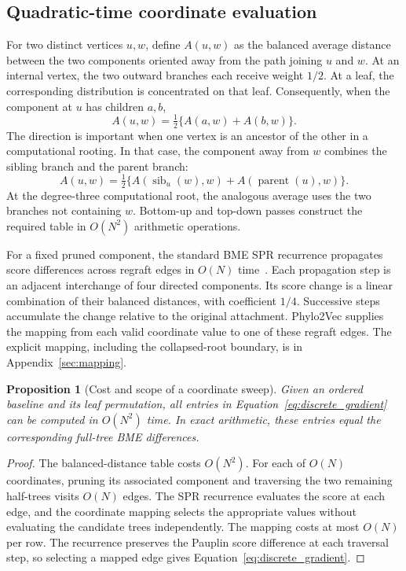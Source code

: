 \documentclass[11pt,a4paper]{article}
\makeatletter
\DeclareRobustCommand{\_}{\ifmmode\nfss@text{\textunderscore}\else\textunderscore\allowbreak\fi}
\newtheorem{proposition}[theorem]{Proposition}
\theoremstyle{definition}
\makeatother
\begin{document}
\subsection{Quadratic-time coordinate evaluation}

For two distinct vertices $u,w$, define $A(u,w)$ as the balanced average distance between the two components oriented away from the path joining $u$ and $w$.
At an internal vertex, the two outward branches each receive weight $1/2$.
At a leaf, the corresponding distribution is concentrated on that leaf.
Consequently, when the component at $u$ has children $a,b$,
\begin{equation}
 A(u,w)=\tfrac12\{A(a,w)+A(b,w)\}.
 \label{eq:bottom_up}
\end{equation}
The direction is important when one vertex is an ancestor of the other in a computational rooting.
In that case, the component away from $w$ combines the sibling branch and the parent branch:
\begin{equation}
 A(u,w)=\tfrac12\{A(\operatorname{sib}_u(w),w)
                         +A(\operatorname{parent}(u),w)\}.
 \label{eq:top_down}
\end{equation}
At the degree-three computational root, the analogous average uses the two branches not containing $w$.
Bottom-up and top-down passes construct the required table in $O(N^2)$ arithmetic operations.

For a fixed pruned component, the standard BME SPR recurrence propagates score differences across regraft edges in $O(N)$ time~\cite{hordijk2005spr}.
Each propagation step is an adjacent interchange of four directed components.
Its score change is a linear combination of their balanced distances, with coefficient $1/4$.
Successive steps accumulate the change relative to the original attachment.
Phylo2Vec supplies the mapping from each valid coordinate value to one of these regraft edges.
The explicit mapping, including the collapsed-root boundary, is in Appendix~\ref{sec:mapping}.

\begin{proposition}[Cost and scope of a coordinate sweep]
\label{prop:quadratic}
Given an ordered baseline and its leaf permutation, all entries in
Equation~\eqref{eq:discrete_gradient} can be computed in $O(N^2)$ time.
In exact arithmetic, these entries equal the corresponding full-tree BME differences.
\end{proposition}
\begin{proof}
The balanced-distance table costs $O(N^2)$.
For each of $O(N)$ coordinates, pruning its associated component and traversing the two remaining half-trees visits $O(N)$ edges.
The SPR recurrence evaluates the score at each edge, and the coordinate mapping selects the appropriate values without evaluating the candidate trees independently.
The mapping costs at most $O(N)$ per row.
The recurrence preserves the Pauplin score difference at each traversal step, so selecting a mapped edge gives Equation~\eqref{eq:discrete_gradient}.
\end{proof}
\end{document}

